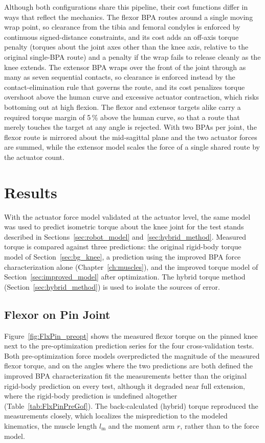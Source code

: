 Although both configurations share this pipeline, their cost functions differ in ways that reflect the mechanics. The flexor BPA routes around a single moving wrap point, so clearance from the tibia and femoral condyles is enforced by continuous signed-distance constraints, and its cost adds an off-axis torque penalty (torques about the joint axes other than the knee axis, relative to the original single-BPA route) and a penalty if the wrap fails to release cleanly as the knee extends. The extensor BPA wraps over the front of the joint through as many as seven sequential contacts, so clearance is enforced instead by the contact-elimination rule that governs the route, and its cost penalizes torque overshoot above the human curve and excessive actuator contraction, which risks bottoming out at high flexion. The flexor and extensor targets alike carry a required torque margin of 5\,\% above the human curve, so that a route that merely touches the target at any angle is rejected. With two BPAs per joint, the flexor route is mirrored about the mid-sagittal plane and the two actuator forces are summed, while the extensor model scales the force of a single shared route by the actuator count.

\section{Results}\label{sec:results_torque}

With the actuator force model validated at the actuator level, the same model was used to predict isometric torque about the knee joint for the test stands described in Sections~\ref{sec:robot_model} and~\ref{sec:hybrid_method}. Measured torque is compared against three predictions: the original rigid-body torque model of Section~\ref{sec:bg_knee}, a prediction using the improved BPA force characterization alone (Chapter~\ref{ch:muscles}), and the improved torque model of Section~\ref{sec:improved_model} after optimization. The hybrid torque method (Section~\ref{sec:hybrid_method}) is used to isolate the sources of error.

\subsection{Flexor on Pin Joint}

Figure~\ref{fig:FlxPin_preopt} shows the measured flexor torque on the pinned knee next to the pre-optimization prediction series for the four cross-validation tests. Both pre-optimization force models overpredicted the magnitude of the measured flexor torque, and on the angles where the two predictions are both defined the improved BPA characterization fit the measurements better than the original rigid-body prediction on every test, although it degraded near full extension, where the rigid-body prediction is undefined altogether (Table~\ref{tab:FlxPinPreGof}). The back-calculated (hybrid) torque reproduced the measurements closely, which localizes the misprediction to the modeled kinematics, the muscle length $l_\text{m}$ and the moment arm $r$, rather than to the force model.


